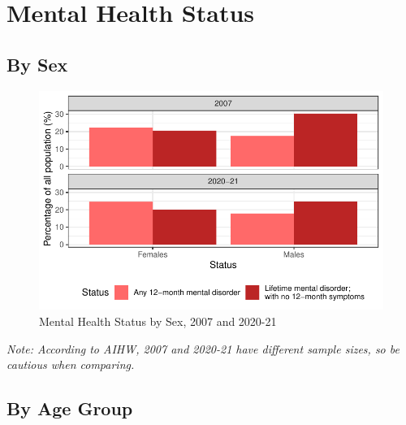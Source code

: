 \documentclass[
  a4paper,
  DIV=11,
  numbers=noendperiod]{scrreport}
\begin{document}
\hypertarget{mental-health-status}{%
\section{Mental Health Status}\label{mental-health-status}}

\hypertarget{by-sex}{%
\subsection{By Sex}\label{by-sex}}

\begin{figure}

\caption{\label{fig-mhss}Mental Health Status by Sex, 2007 and 2020-21}

{\centering \includegraphics{./chap1-prevalence-of-md_files/figure-pdf/fig-mhss-1.pdf}

}

\end{figure}

\emph{Note: According to AIHW, 2007 and 2020-21 have different sample
sizes, so be cautious when comparing.}

\hypertarget{by-age-group}{%
\subsection{By Age Group}\label{by-age-group}}
\end{document}
